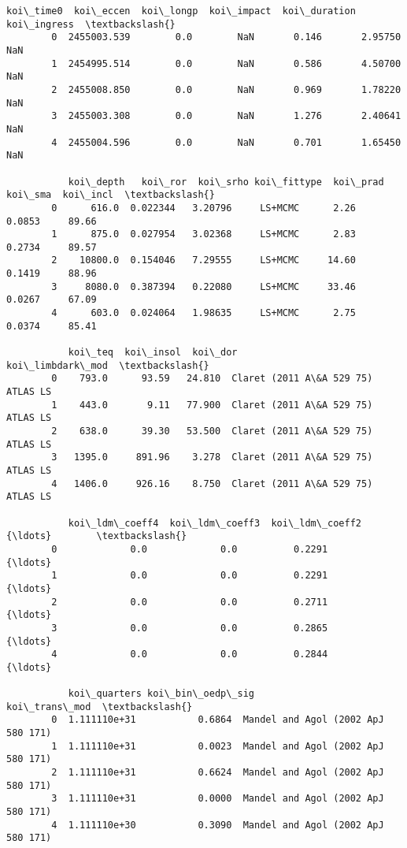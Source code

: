 \documentclass[11pt]{article}
\begin{document}
\begin{Verbatim}[commandchars=\\\{\}]
             koi\_time0  koi\_eccen  koi\_longp  koi\_impact  koi\_duration  koi\_ingress  \textbackslash{}
        0  2455003.539        0.0        NaN       0.146       2.95750          NaN   
        1  2454995.514        0.0        NaN       0.586       4.50700          NaN   
        2  2455008.850        0.0        NaN       0.969       1.78220          NaN   
        3  2455003.308        0.0        NaN       1.276       2.40641          NaN   
        4  2455004.596        0.0        NaN       0.701       1.65450          NaN   
        
           koi\_depth   koi\_ror  koi\_srho koi\_fittype  koi\_prad  koi\_sma  koi\_incl  \textbackslash{}
        0      616.0  0.022344   3.20796     LS+MCMC      2.26   0.0853     89.66   
        1      875.0  0.027954   3.02368     LS+MCMC      2.83   0.2734     89.57   
        2    10800.0  0.154046   7.29555     LS+MCMC     14.60   0.1419     88.96   
        3     8080.0  0.387394   0.22080     LS+MCMC     33.46   0.0267     67.09   
        4      603.0  0.024064   1.98635     LS+MCMC      2.75   0.0374     85.41   
        
           koi\_teq  koi\_insol  koi\_dor                   koi\_limbdark\_mod  \textbackslash{}
        0    793.0      93.59   24.810  Claret (2011 A\&A 529 75) ATLAS LS   
        1    443.0       9.11   77.900  Claret (2011 A\&A 529 75) ATLAS LS   
        2    638.0      39.30   53.500  Claret (2011 A\&A 529 75) ATLAS LS   
        3   1395.0     891.96    3.278  Claret (2011 A\&A 529 75) ATLAS LS   
        4   1406.0     926.16    8.750  Claret (2011 A\&A 529 75) ATLAS LS   
        
           koi\_ldm\_coeff4  koi\_ldm\_coeff3  koi\_ldm\_coeff2       {\ldots}        \textbackslash{}
        0             0.0             0.0          0.2291       {\ldots}         
        1             0.0             0.0          0.2291       {\ldots}         
        2             0.0             0.0          0.2711       {\ldots}         
        3             0.0             0.0          0.2865       {\ldots}         
        4             0.0             0.0          0.2844       {\ldots}         
        
           koi\_quarters koi\_bin\_oedp\_sig                       koi\_trans\_mod  \textbackslash{}
        0  1.111110e+31           0.6864  Mandel and Agol (2002 ApJ 580 171)   
        1  1.111110e+31           0.0023  Mandel and Agol (2002 ApJ 580 171)   
        2  1.111110e+31           0.6624  Mandel and Agol (2002 ApJ 580 171)   
        3  1.111110e+31           0.0000  Mandel and Agol (2002 ApJ 580 171)   
        4  1.111110e+30           0.3090  Mandel and Agol (2002 ApJ 580 171)   
        

\end{Verbatim}
\end{document}
